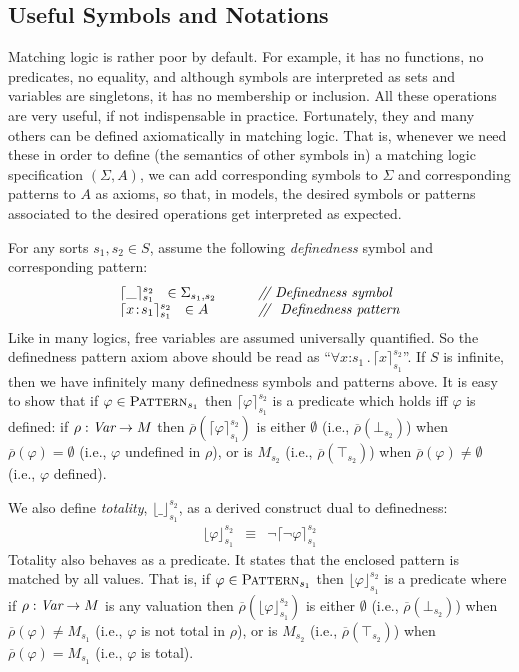 \documentclass[UTF8,11pt]{article}
\theoremstyle{plain}
\theoremstyle{definition}
\theoremstyle{remark}
\newcommand{\cln}{\texttt{:}}
\newcommand{\doubleslash}{/\!/{ }}
\newcommand{\Pattern}{\textsc{Pattern}\xspace}
\newcommand{\ra}{\rightarrow}
\begin{document}
\subsection{Useful Symbols and Notations}
\label{sec:useful}

Matching logic is rather poor by default.
For example, it has no functions, no predicates, no equality, and although
symbols are interpreted as sets and variables are singletons, it has no
membership or inclusion.
All these operations are very useful, if not indispensable in practice.
Fortunately, they and many others can be defined axiomatically in matching
logic.
That is, whenever we need these in order to define (the semantics of other
symbols in) a matching logic specification $(\Sigma,A)$, we can add
corresponding symbols to $\Sigma$ and corresponding patterns to $A$ as axioms,
so that, in models, the desired symbols or patterns associated to the
desired operations get interpreted as expected.

For any sorts $s_1,s_2\in S$, assume the following \emph{definedness}
symbol and corresponding pattern:
$$
\begin{array}{l@{\hspace*{7ex}}l}
\lceil\_\rceil_{s_1}^{s_2} \ \ \in \Sigma_{s_1,s_2}
& \mbox{\it \doubleslash Definedness symbol} \\
\lceil x\!:\! s_1 \rceil_{s_1}^{s_2} \ \ \in A & \mbox{\it \doubleslash 
Definedness 
pattern}
\end{array}
$$
Like in many logics, free variables are assumed universally quantified.
So the definedness pattern axiom above should be read as
``$\forall x\cln s_1\,.\,\lceil x \rceil_{s_1}^{s_2}$''.
If $S$ is infinite, then we have infinitely many definedness symbols and patterns
above.
It is easy to show that if $\varphi \in \Pattern_{s_1}$ then
$\lceil\varphi\rceil_{s_1}^{s_2}$ is a predicate which holds iff $\varphi$ is
defined:
if $\rho : \Var \ra M$ then
$\overline{\rho}(\lceil\varphi\rceil_{s_1}^{s_2})$ is either $\emptyset$
(i.e., $\overline{\rho}(\bot_{s_2})$)
when $\overline{\rho}(\varphi) = \emptyset$
(i.e., $\varphi$ undefined in $\rho$), or is $M_{s_2}$
(i.e., $\overline{\rho}(\top_{s_2})$) 
when $\overline{\rho}(\varphi) \neq \emptyset$ (i.e., $\varphi$ defined).

We also define \emph{totality}, $\lfloor\_\rfloor_{s_1}^{s_2}$, as a derived
construct dual to definedness:
$$
\begin{array}{lcl}
\lfloor\varphi\rfloor_{s_1}^{s_2}
& \equiv &
\neg\lceil\neg\varphi\rceil_{s_1}^{s_2}
\end{array}
$$
Totality also behaves as a predicate.
It states that the enclosed pattern is matched by all values.
That is, if $\varphi \in \Pattern_{s_1}$ then $\lfloor\varphi\rfloor_{s_1}^{s_2}$
is a predicate where if $\rho : \Var \ra M$ is any valuation
then $\overline{\rho}(\lfloor\varphi\rfloor_{s_1}^{s_2})$ is either $\emptyset$
(i.e., $\overline{\rho}(\bot_{s_2})$)
when $\overline{\rho}(\varphi) \neq M_{s_1}$
(i.e., $\varphi$ is not total in $\rho$), or is $M_{s_2}$
(i.e., $\overline{\rho}(\top_{s_2})$) 
when $\overline{\rho}(\varphi) = M_{s_1}$
(i.e., $\varphi$ is total).
\end{document}
